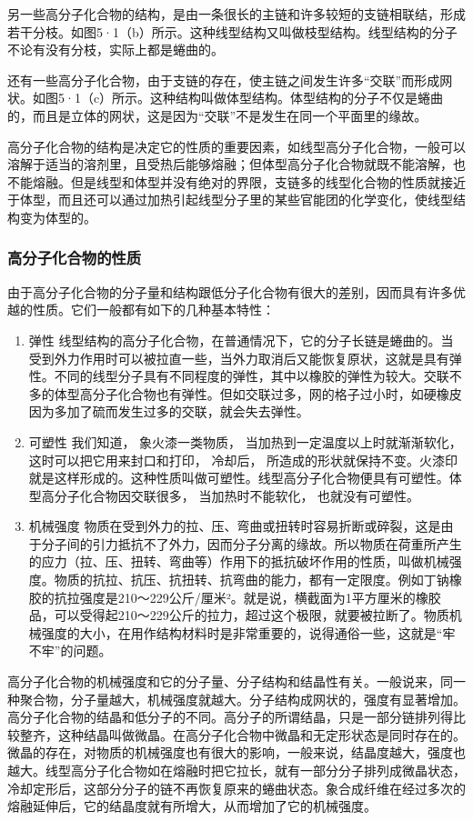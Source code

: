 另一些高分子化合物的结构，是由一条很长的主链和许多较短的支链相联结，形成若干分枝。如图5·1（b）所示。这种线型结构又叫做枝型结构。线型结构的分子不论有没有分枝，实际上都是蜷曲的。

还有一些高分子化合物，由于支链的存在，使主链之间发生许多``交联''而形成网状。如图5·1（c）所示。这种结构叫做体型结构。体型结构的分子不仅是蜷曲的，而且是立体的网状，这是因为``交联''不是发生在同一个平面里的缘故。

高分子化合物的结构是决定它的性质的重要因素，如线型高分子化合物，一般可以溶解于适当的溶剂里，且受热后能够熔融；但体型高分子化合物就既不能溶解，也不能熔融。但是线型和体型并没有绝对的界限，支链多的线型化合物的性质就接近于体型，而且还可以通过加热引起线型分子里的某些官能团的化学变化，使线型结构变为体型的。

\subsubsection{高分子化合物的性质}

由于高分子化合物的分子量和结构跟低分子化合物有很大的差别，因而具有许多优越的性质。它们一般都有如下的几种基本特性：

\begin{enumerate}
\item
  弹性
  线型结构的高分子化合物，在普通情况下，它的分子长链是蜷曲的。当受到外力作用时可以被拉直一些，当外力取消后又能恢复原状，这就是具有弹性。不同的线型分子具有不同程度的弹性，其中以橡胶的弹性为较大。交联不多的体型高分子化合物也有弹性。但如交联过多，网的格子过小时，如硬橡皮因为多加了硫而发生过多的交联，就会失去弹性。
\item
  可塑性 我们知道， 象火漆一类物质， 当加热到一定温度以上时就渐渐软化，
  这时可以把它用来封口和打印， 冷却后，
  所造成的形状就保持不变。火漆印就是这样形成的。这种性质叫做可塑性。线型高分子化合物便具有可塑性。体型高分子化合物因交联很多，
  当加热时不能软化， 也就没有可塑性。
\item
  机械强度
  物质在受到外力的拉、压、弯曲或扭转时容易折断或碎裂，这是由于分子间的引力抵抗不了外力，因而分子分离的缘故。所以物质在荷重所产生的应力（拉、压、扭转、弯曲等）作用下的抵抗破坏作用的性质，叫做机械强度。物质的抗拉、抗压、抗扭转、抗弯曲的能力，都有一定限度。例如丁钠橡胶的抗拉强度是210～229公斤/厘米²。就是说，横截面为1平方厘米的橡胶品，可以受得起210～229公斤的拉力，超过这个极限，就要被拉断了。物质机械强度的大小，在用作结构材料时是非常重要的，说得通俗一些，这就是``牢不牢''的问题。
\end{enumerate}

高分子化合物的机械强度和它的分子量、分子结构和结晶性有关。一般说来，同一种聚合物，分子量越大，机械强度就越大。分子结构成网状的，强度有显著增加。高分子化合物的结晶和低分子的不同。高分子的所谓结晶，只是一部分链排列得比较整齐，这种结晶叫做微晶。在高分子化合物中微晶和无定形状态是同时存在的。微晶的存在，对物质的机械强度也有很大的影响，一般来说，结晶度越大，强度也越大。线型高分子化合物如在熔融时把它拉长，就有一部分分子排列成微晶状态，冷却定形后，这部分分子的链不再恢复原来的蜷曲状态。象合成纤维在经过多次的熔融延伸后，它的结晶度就有所增大，从而增加了它的机械强度。

